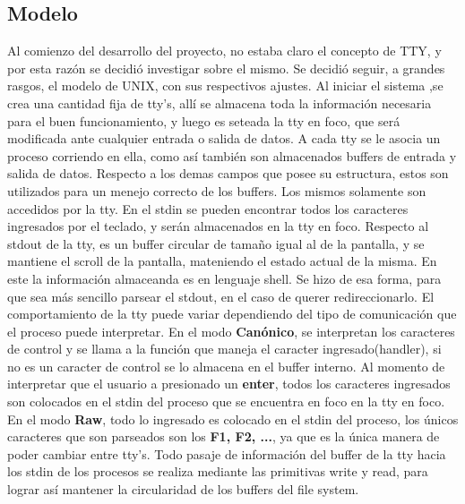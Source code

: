 \documentclass[10pt,a4paper]{article}
\begin{document}
	\subsection{Modelo}
		Al comienzo del desarrollo del proyecto, no estaba claro el concepto de TTY, y por esta raz\'on se decidi\'o investigar sobre el mismo. Se decidi\'o seguir, a grandes rasgos, el modelo de UNIX, con sus respectivos ajustes. Al iniciar el sistema ,se crea una cantidad fija de tty's, all\'i se almacena toda la informaci\'on necesaria para el buen funcionamiento, y luego es seteada la tty en foco, que ser\'a modificada ante cualquier entrada o salida de datos. A cada tty se le asocia un proceso corriendo en ella, como as\'i tambi\'en son almacenados buffers de entrada y salida de datos. Respecto a los demas campos que posee su estructura, estos son utilizados para un menejo correcto de los buffers. Los mismos solamente son accedidos por la tty. En el stdin se pueden encontrar todos los caracteres ingresados por el teclado, y ser\'an almacenados en la tty en foco. Respecto al stdout de la tty, es un buffer circular de tama\~no igual al de la pantalla, y se mantiene el scroll de la pantalla, mateniendo el estado actual de la misma. En este la informaci\'on almaceanda es en lenguaje shell. Se hizo de esa forma, para que sea m\'as sencillo parsear el stdout, en el caso de querer redireccionarlo.
		El comportamiento de la tty puede variar dependiendo del tipo de comunicaci\'on que el proceso puede interpretar. En el modo \textbf{Can\'onico}, se interpretan los caracteres de control y se llama a la funci\'on que maneja el caracter ingresado(handler), si no es un caracter de control se lo almacena en el buffer interno. Al momento de interpretar que el usuario a presionado un \textbf{enter}, todos los caracteres ingresados son colocados en el stdin del proceso que se encuentra en foco en la tty en foco. 
		En el modo \textbf{Raw}, todo lo ingresado es colocado en el stdin del proceso, los \'unicos caracteres que son parseados son los \textbf{F1, F2, ...}, ya que es la \'unica manera de poder cambiar entre tty's. 
		Todo pasaje de informaci\'on del buffer de la tty hacia los stdin de los procesos se realiza mediante las primitivas write y read, para lograr as\'i mantener la circularidad de los buffers del file system.
\end{document}
